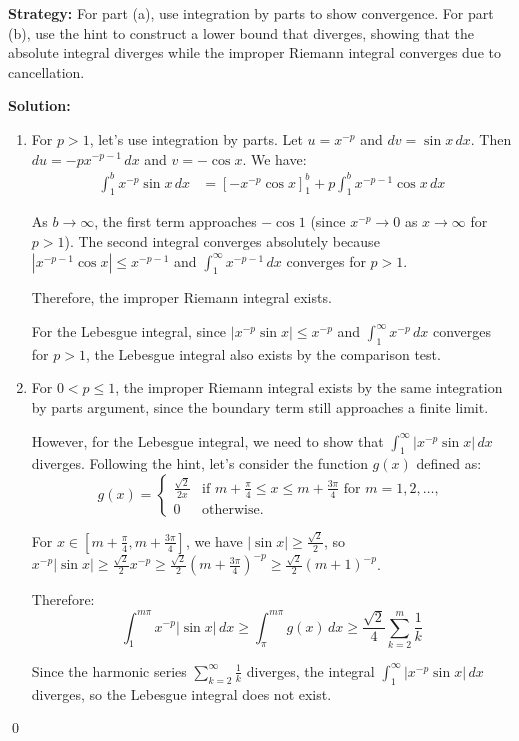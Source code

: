 \noindent\textbf{Strategy:} For part (a), use integration by parts to show convergence. For part (b), use the hint to construct a lower bound that diverges, showing that the absolute integral diverges while the improper Riemann integral converges due to cancellation.

\bigskip\noindent\textbf{Solution:}
\begin{enumerate}[label=(\alph*)]
\item For $p > 1$, let's use integration by parts. Let $u = x^{-p}$ and $dv = \sin x \, dx$. Then $du = -px^{-p-1} \, dx$ and $v = -\cos x$. We have:
\begin{align*}
\int_1^b x^{-p} \sin x \, dx &= \left[-x^{-p} \cos x\right]_1^b + p \int_1^b x^{-p-1} \cos x \, dx
\end{align*}

As $b \to \infty$, the first term approaches $-\cos 1$ (since $x^{-p} \to 0$ as $x \to \infty$ for $p > 1$). The second integral converges absolutely because $|x^{-p-1} \cos x| \leq x^{-p-1}$ and $\int_1^\infty x^{-p-1} \, dx$ converges for $p > 1$.

Therefore, the improper Riemann integral exists.

For the Lebesgue integral, since $|x^{-p} \sin x| \leq x^{-p}$ and $\int_1^\infty x^{-p} \, dx$ converges for $p > 1$, the Lebesgue integral also exists by the comparison test.

\item For $0 < p \leq 1$, the improper Riemann integral exists by the same integration by parts argument, since the boundary term still approaches a finite limit.

However, for the Lebesgue integral, we need to show that $\int_1^\infty |x^{-p} \sin x| \, dx$ diverges. Following the hint, let's consider the function $g(x)$ defined as:
\[g(x) = 
\begin{cases} 
\frac{\sqrt{2}}{2x} & \text{if } m + \frac{\pi}{4} \leq x \leq m + \frac{3\pi}{4} \text{ for } m = 1, 2, \ldots, \\ 
0 & \text{otherwise}.
\end{cases}\]

For $x \in [m + \frac{\pi}{4}, m + \frac{3\pi}{4}]$, we have $|\sin x| \geq \frac{\sqrt{2}}{2}$, so $x^{-p} |\sin x| \geq \frac{\sqrt{2}}{2} x^{-p} \geq \frac{\sqrt{2}}{2} (m + \frac{3\pi}{4})^{-p} \geq \frac{\sqrt{2}}{2} (m + 1)^{-p}$.

Therefore:
\[\int_{1}^{m\pi} x^{-p} |\sin x| \, dx \geq \int_{\pi}^{m\pi} g(x) \, dx \geq \frac{\sqrt{2}}{4} \sum_{k=2}^{m} \frac{1}{k}\]

Since the harmonic series $\sum_{k=2}^{\infty} \frac{1}{k}$ diverges, the integral $\int_1^\infty |x^{-p} \sin x| \, dx$ diverges, so the Lebesgue integral does not exist.
\end{enumerate}\qed


